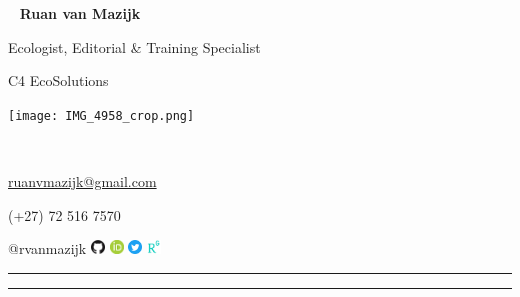 \begin{multicols}{3}
  \
  \vfill
  \raggedleft
    {\huge \textbf{Ruan van Mazijk}} \par
    {\large Ecologist, Editorial \& Training Specialist} \par
    C4 EcoSolutions
  \vfill
  \
  \begin{center}
    \texttt{[image: IMG\_4958\_crop.png]}
  \end{center}
  \columnbreak
  \par \
  \vfill
  \raggedright
    {\large \href{mailto:ruanvmazijk@gmail.com}{ruanvmazijk@gmail.com}} \par
    (+27) 72 516 7570 \par
    @rvanmazijk
      \href{https://github.com/rvanmazijk}
           {\includegraphics[width=1em]{logos/GitHub.png}}
      \href{https://orcid.org/0000-0003-2659-6909}
           {\includegraphics[width=1em]{logos/ORCID.png}}
      \href{https://twitter.com/rvanmazijk}
           {\includegraphics[width=1em]{logos/Twitter.png}}
      \href{https://www.researchgate.net/profile/Ruan-Van-Mazijk}
           {\includegraphics[width=1em]{logos/ResearchGate-white_crop.jpg}}
  \vfill
  \
\end{multicols}

\hrule \vskip2pt \hrule
